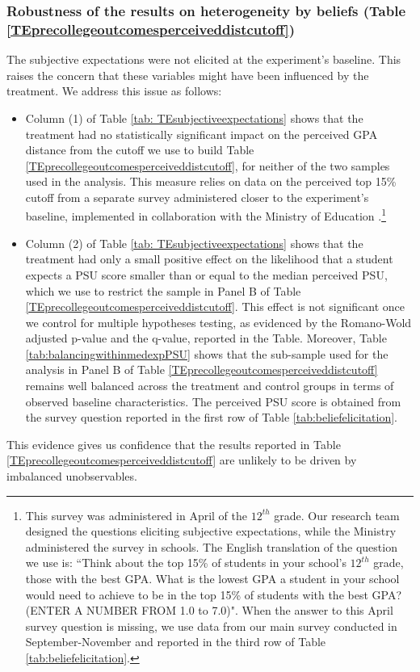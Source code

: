 \subsubsection{Robustness of the results on heterogeneity by beliefs (Table \ref{TEprecollegeoutcomesperceiveddistcutoff})}\label{sec:robustnesshet}

The subjective expectations were not elicited at the experiment's baseline. This raises the concern that these variables might have been influenced by the treatment. We address this issue as follows:
\begin{itemize}
    \item Column (1) of Table \ref{tab: TEsubjectiveexpectations} shows that the treatment had no statistically significant impact on the perceived GPA distance from the cutoff we use to build Table \ref{TEprecollegeoutcomesperceiveddistcutoff}, for neither of the two samples used in the analysis. This measure relies on data on the perceived top 15\% cutoff from a separate survey administered closer to the experiment's baseline, implemented in collaboration with the Ministry of Education \citep{mineduc_estudio_pace_estudiantes_mrun}.\footnote{This survey was administered in April of the $12^{th}$ grade. Our research team designed the questions eliciting subjective expectations, while the Ministry administered the survey in schools. The English translation of the question we use is: ``Think about the top 15\% of students in your school's $12^{th}$ grade, those with the best GPA. What is the lowest GPA a student in your school would need to achieve to be in the top 15\% of students with the best GPA? (ENTER A NUMBER FROM 1.0 to 7.0)". When the answer to this April survey question is missing, we use data from our main survey conducted in September-November and reported in the third row of Table \ref{tab:beliefelicitation}.}
    \item Column (2) of Table \ref{tab: TEsubjectiveexpectations} shows that the treatment had only a small positive effect on the likelihood that a student expects a PSU score smaller than or equal to the median perceived PSU, which we use to restrict the sample in Panel B of Table \ref{TEprecollegeoutcomesperceiveddistcutoff}. This effect is not significant once we control for multiple hypotheses testing, as evidenced by the Romano-Wold adjusted p-value and the q-value, reported in the Table. Moreover, Table \ref{tab:balancingwithinmedexpPSU} shows that the sub-sample used for the analysis in Panel B of Table \ref{TEprecollegeoutcomesperceiveddistcutoff} remains well balanced across the treatment and control groups in terms of observed baseline characteristics. The perceived PSU score is obtained from the survey question reported in the first row of Table \ref{tab:beliefelicitation}.
\end{itemize} 
 This evidence gives us confidence that the results reported in Table \ref{TEprecollegeoutcomesperceiveddistcutoff} are unlikely to be driven by imbalanced unobservables.


